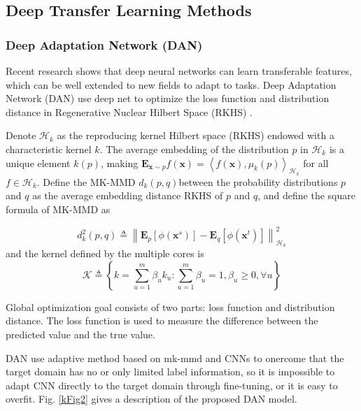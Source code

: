 \documentclass[conference]{IEEEtran}
\begin{document}
\subsection{Deep Transfer Learning Methods}

\subsubsection{Deep Adaptation Network (DAN)}

Recent research shows that deep neural networks can learn transferable features, which can be well extended to new fields to adapt to tasks. Deep Adaptation Network (DAN) use deep net to optimize the loss function and distribution distance in Regenerative Nuclear Hilbert Space (RKHS) \cite{Long2015Learning}.

Denote $\mathcal{H}_{k}$ as the reproducing kernel Hilbert space (RKHS) endowed with a characteristic kernel $k$. The average embedding of the distribution $p$ in $\mathcal{H}_{k}$ is a unique element $k(p)$, making $\mathbf{E}_{\mathbf{x} \sim p} f(\mathbf{x})=\left\langle f( \mathbf{x}), \mu_{k}(p)\right\rangle_{\mathcal{H}_{k}}$ for all $f \in \mathcal{H}_{k}$. Define the MK-MMD $d_{k}(p, q)$between the probability distributions $p$ and $q$ as the average embedding distance RKHS of $p$ and $q$, and define the square formula of MK-MMD as

$$
d_{k}^{2}(p, q) \triangleq\left\|\mathbf{E}_{p}\left[\phi\left(\mathbf{x}^{s}\right)\right]-\mathbf{E}_{q}\left[\phi\left(\mathbf{x}^{t}\right)\right]\right\|_{\mathcal{H}_{k}}^{2}
$$
and the kernel defined by the multiple cores is
$$
\mathcal{K} \triangleq\left\{k=\sum_{u=1}^{m} \beta_{u} k_{u}: \sum_{u=1}^{m} \beta_{u}=1, \beta_{u} \geqslant 0, \forall u\right\}
$$

Global optimization goal consists of two parts: loss function and distribution distance. The loss function is used to measure the difference between the predicted value and the true value.

DAN use adaptive method based on mk-mmd and CNNs to onercome that the target domain has no or only limited label information, so it is impossible to adapt CNN directly to the target domain through fine-tuning, or it is easy to overfit. Fig. \ref{kFig2} gives a description of the proposed DAN model.
\end{document}
